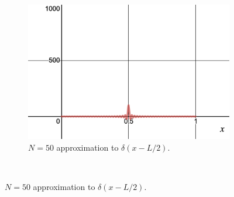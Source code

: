 \documentclass[12pt]{article} %
\begin{document}
\begin{solution}
\begin{enumerate}[(a)]
\begin{figure}[H]
\begin{subfigure}[h]{0.4\textwidth}
									\includegraphics[width=\textwidth]{Figures/delta_N=50.png}
									\caption{$N=50$ approximation to $\delta(x-L/2)$.}
								\end{subfigure}\\
								

\end{figure}
\end{enumerate}
\end{solution}
\end{document}
